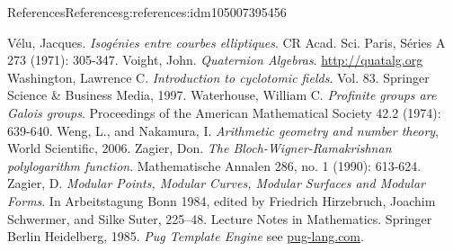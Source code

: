 \documentclass[oneside,10pt,]{book}
\numberwithin{equation}{section}
\begin{document}
\begin{references-chapter-numberless}{References}{}{References}{}{}{g:references:idm105007395456}
\begin{thebibliography}{9}
\hypertarget{x:biblio:bib-velu}{}Vélu, Jacques. \textit{Isogénies entre courbes elliptiques}. CR Acad. Sci. Paris, Séries A 273 (1971): 305-347.
\hypertarget{x:biblio:bib-voight-quat}{}Voight, John. \textit{Quaternion Algebras}. \url{http://quatalg.org}
\hypertarget{x:biblio:bib-washington}{}Washington, Lawrence C. \textit{Introduction to cyclotomic fields}. Vol. 83. Springer Science \& Business Media, 1997.
\hypertarget{x:biblio:bib-waterhouse}{}Waterhouse, William C.  \textit{Profinite groups are Galois groups}. Proceedings of the American Mathematical Society 42.2 (1974): 639-640.
\hypertarget{x:biblio:bib-weng-nakamura}{}Weng, L., and Nakamura, I. \textit{Arithmetic geometry and number theory}, World Scientific, 2006.
\hypertarget{x:biblio:bib-zag-ram}{}Zagier, Don.  \textit{The Bloch-Wigner-Ramakrishnan polylogarithm function}. Mathematische Annalen 286, no. 1 (1990): 613-624.
\hypertarget{x:biblio:bib-zagier-modular}{}Zagier, D. \textit{Modular Points, Modular Curves, Modular Surfaces and Modular Forms}. In Arbeitstagung Bonn 1984, edited by Friedrich Hirzebruch, Joachim Schwermer, and Silke Suter, 225–48. Lecture Notes in Mathematics. Springer Berlin Heidelberg, 1985.
\hypertarget{x:biblio:bib-pug}{}\textit{Pug Template Engine} see \href{http://pug-lang.com/}{pug-lang.com}.
\end{thebibliography}
\end{references-chapter-numberless}
\end{document}
